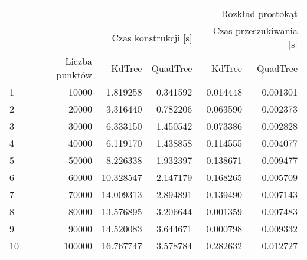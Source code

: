 \begin{tabular}{lrrrrr}
\toprule
 & \multicolumn{5}{r}{Rozkład prostokąt} \\
 &  & \multicolumn{2}{r}{Czas konstrukcji [s]} & \multicolumn{2}{r}{Czas przeszukiwania [s]} \\
 & Liczba punktów & KdTree & QuadTree & KdTree & QuadTree \\
\midrule
1 & 10000 & 1.819258 & 0.341592 & 0.014448 & 0.001301 \\
2 & 20000 & 3.316440 & 0.782206 & 0.063590 & 0.002373 \\
3 & 30000 & 6.333150 & 1.450542 & 0.073386 & 0.002828 \\
4 & 40000 & 6.119170 & 1.438858 & 0.114555 & 0.004077 \\
5 & 50000 & 8.226338 & 1.932397 & 0.138671 & 0.009477 \\
6 & 60000 & 10.328547 & 2.147179 & 0.168265 & 0.005709 \\
7 & 70000 & 14.009313 & 2.894891 & 0.139490 & 0.007143 \\
8 & 80000 & 13.576895 & 3.206644 & 0.001359 & 0.007483 \\
9 & 90000 & 14.520083 & 3.644671 & 0.000798 & 0.009332 \\
10 & 100000 & 16.767747 & 3.578784 & 0.282632 & 0.012727 \\
\bottomrule
\end{tabular}
